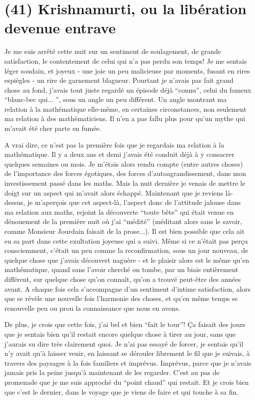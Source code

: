 \section{(41) Krishnamurti, ou la libération devenue entrave}

Je me suis arrêté cette nuit sur un sentiment de soulagement, de grande satisfaction, le contentement de celui qui n'a pas perdu son temps! Je me sentais léger soudain, et joyeux - une joie un peu malicieuse par moments, fusant en rires espiègles - un rire de garnement blagueur. Pourtant je n'avais pas fait grand chose au fond, j'avais tout juste regardé un épisode déjà ``connu'', celui du fameux ``blanc-bec qui... '', sous un angle un peu différent. Un angle montrant ma relation à la mathématique elle-même, en certaines circonstances, non seulement ma relation à des mathématiciens. Il n'en a pas fallu plus pour qu'un mythe qui m'avait été cher parte en fumée.

A vrai dire, ce n'est pas la première fois que je regardais ma relation à la mathématique. Il y a deux ans et demi j'avais été conduit déjà à y consacrer quelques semaines ou mois. Je m'étais alors rendu compte (entre autres choses) de l'importance des forces égotiques, des forces d'autoagrandissement, dans mon investissement passé dans les maths. Mais la nuit dernière je venais de mettre le doigt sur un aspect qui m'avait alors échappé. Maintenant que je reviens là-dessus, je m'aperçois que cet aspect-là, l'aspect donc de l'attitude jalouse dans ma relation aux maths, rejoint la découverte ``toute bête'' qui était venue en dénouement de la première nuit où j'ai ``médité'' (méditant alors sans le savoir, comme Monsieur Jourdain faisait de la prose...). Il est bien possible que cela ait eu sa part dans cette exultation joyeuse qui a suivi. Même si ce n'était pas perçu consciemment, c'était un peu comme la reconfirmation, sous un jour nouveau, de quelque chose que j'avais découvert naguère - et le plaisir alors est le même qu'en mathématique, quand sans l'avoir cherché on tombe, par un biais entièrement différent, sur quelque chose qu'on connaît, qu'on a trouvé peut-être des années avant. A chaque fois cela s'accompagne d'un sentiment d'intime satisfaction, alors que se révèle une nouvelle fois l'harmonie des choses, et qu'en même temps se renouvelle peu ou prou la connaissance que nous en avons.

De plus, je crois que cette fois, j'ai bel et bien ``fait le tour''! Ça faisait des jours que je sentais bien qu'il restait encore quelque chose à tirer au jour, sans que j'aurais su dire très clairement quoi. Je n'ai pas essayé de forcer, je sentais qu'il n'y avait qu'à laisser venir, en laissant se dérouler librement le fil que je suivais, à travers des paysages à la fois familiers et imprévus. Imprévus, parce que je n'avais jamais pris la peine jusqu'à maintenant de les regarder. C'est au pas de promenade que je me suis approché du ``point chaud'' qui restait. Et je crois bien que c'est le dernier, dans le voyage que je viens de faire et qui touche à sa fin.

